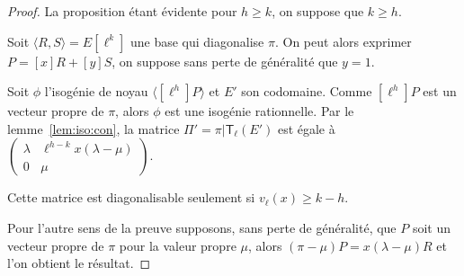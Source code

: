 \documentclass[10pt,a4paper]{book}
\theoremstyle{plain}
\theoremstyle{definition}
\theoremstyle{definition}
\theoremstyle{definition}
\theoremstyle{definition}
\theoremstyle{remark}
\theoremstyle{remark}
\theoremstyle{definition}
\begin{document}
\begin{proof}
La proposition étant évidente pour $h \geqslant k$,
on suppose que $k \geqslant h$.

Soit $\langle R,S \rangle =E[\ell^k]$ une base qui diagonalise $\pi$.
On peut alors exprimer $P=[x]R+[y]S$, on suppose sans perte de généralité
que $y=1$.

Soit $\phi$ l'isogénie de noyau $\langle [\ell^h]P \rangle$ et $E'$ son 
codomaine. Comme $[\ell^h]P$ est un vecteur propre de $\pi$, alors $\phi$ est 
une isogénie rationnelle. Par le lemme~\ref{lem:iso:con}, la matrice 
$\Pi'=\pi|\mathsf{T}_{\ell}(E')$ est égale à $\left ( \begin{smallmatrix}\lambda & \ell^{h-k} 
x (\lambda-\mu)\\ 0 & \mu \end{smallmatrix}\right )$.  

Cette matrice est diagonalisable seulement si $v_{\ell}(x) \geqslant k - h$.

Pour l'autre sens de la preuve supposons, sans perte de généralité, que $P$ soit 
un vecteur propre de $\pi$ pour la valeur propre $\mu$, alors 
$(\pi - \mu) P = x (\lambda - \mu) R$ et l'on obtient le résultat.
\end{proof}
\end{document}
